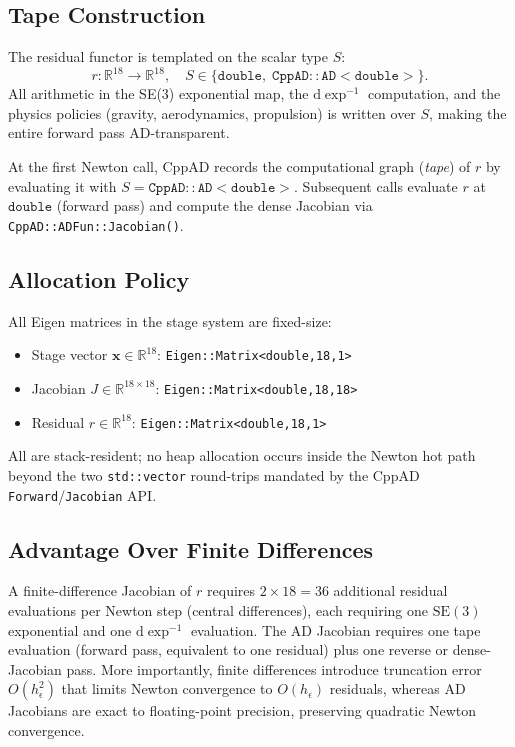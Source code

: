 \documentclass[a4paper,10pt]{article}
\newcommand{\SE}{\mathrm{SE}(3)}
\newcommand{\dexp}{\mathrm{d}\exp}
\newcommand{\R}{\mathbb{R}}
\theoremstyle{definition}
\begin{document}
\subsection{Tape Construction}

The residual functor is templated on the scalar type $S$:
\begin{equation}
  r: \R^{18} \to \R^{18},\quad
  S \in \{\mathtt{double},\; \mathtt{CppAD::AD<double>}\}.
\end{equation}
All arithmetic in the SE(3) exponential map, the $\dexp^{-1}$ computation, and
the physics policies (gravity, aerodynamics, propulsion) is written over $S$,
making the entire forward pass AD-transparent.

At the first Newton call, CppAD records the computational graph (\emph{tape})
of $r$ by evaluating it with $S = \mathtt{CppAD::AD<double>}$.  Subsequent
calls evaluate $r$ at $\mathtt{double}$ (forward pass) and compute the dense
Jacobian via \texttt{CppAD::ADFun::Jacobian()}.

\subsection{Allocation Policy}

All Eigen matrices in the stage system are fixed-size:
\begin{itemize}
  \item Stage vector $\mathbf{x} \in \R^{18}$: \texttt{Eigen::Matrix<double,18,1>}
  \item Jacobian $J \in \R^{18\times18}$: \texttt{Eigen::Matrix<double,18,18>}
  \item Residual $r \in \R^{18}$: \texttt{Eigen::Matrix<double,18,1>}
\end{itemize}
All are stack-resident; no heap allocation occurs inside the Newton hot path
beyond the two \texttt{std::vector} round-trips mandated by the CppAD
\texttt{Forward}/\texttt{Jacobian} API.

\subsection{Advantage Over Finite Differences}

A finite-difference Jacobian of $r$ requires $2 \times 18 = 36$ additional
residual evaluations per Newton step (central differences), each requiring
one $\SE$ exponential and one $\dexp^{-1}$ evaluation.  The AD Jacobian
requires one tape evaluation (forward pass, equivalent to one residual) plus
one reverse or dense-Jacobian pass.  More importantly, finite differences
introduce truncation error $O(h_\epsilon^2)$ that limits Newton convergence
to $O(h_\epsilon)$ residuals, whereas AD Jacobians are exact to floating-point
precision, preserving quadratic Newton convergence.
\end{document}
